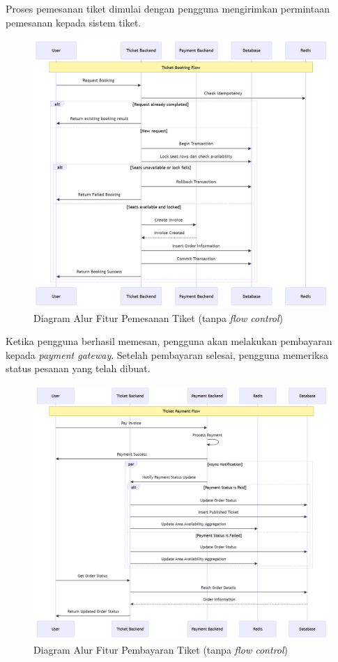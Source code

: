 Proses pemesanan tiket dimulai dengan pengguna mengirimkan permintaan pemesanan kepada sistem tiket.

\begin{figure}[h]
    \centering
    \includegraphics[width=1\textwidth]{resources/chapter-3/book-flow.png}
    \caption{Diagram Alur Fitur Pemesanan Tiket (tanpa \textit{flow control})}
    \label{fig:flow-book-flow}
\end{figure}

\pagebreak

Ketika pengguna berhasil memesan, pengguna akan melakukan pembayaran kepada \textit{payment gateway}. Setelah pembayaran selesai, pengguna memeriksa status pesanan yang telah dibuat.

\begin{figure}[h]
    \centering
    \includegraphics[width=1\textwidth]{resources/chapter-3/order-payment.png}
    \caption{Diagram Alur Fitur Pembayaran Tiket (tanpa \textit{flow control})}
    \label{fig:flow-order-payment-flow}
\end{figure}

